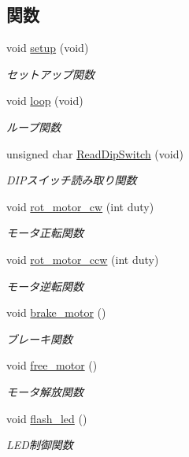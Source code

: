 \subsection*{関数}
\begin{DoxyCompactItemize}
\item 
void \mbox{\hyperlink{iraira__bo__up__down_8ino_a7dfd9b79bc5a37d7df40207afbc5431f}{setup}} (void)
\begin{DoxyCompactList}\small\item\em セットアップ関数 \end{DoxyCompactList}\item 
void \mbox{\hyperlink{iraira__bo__up__down_8ino_a0b33edabd7f1c4e4a0bf32c67269be2f}{loop}} (void)
\begin{DoxyCompactList}\small\item\em ループ関数 \end{DoxyCompactList}\item 
unsigned char \mbox{\hyperlink{iraira__bo__up__down_8ino_a77b0a767d95108a48a54b857588d2863}{Read\+Dip\+Switch}} (void)
\begin{DoxyCompactList}\small\item\em D\+I\+Pスイッチ読み取り関数 \end{DoxyCompactList}\item 
void \mbox{\hyperlink{iraira__bo__up__down_8ino_a0c28692fe5e9f44573ec307d7cae2d9b}{rot\+\_\+motor\+\_\+cw}} (int duty)
\begin{DoxyCompactList}\small\item\em モータ正転関数 \end{DoxyCompactList}\item 
void \mbox{\hyperlink{iraira__bo__up__down_8ino_a0a80149a1ef7c2030aba634830be590a}{rot\+\_\+motor\+\_\+ccw}} (int duty)
\begin{DoxyCompactList}\small\item\em モータ逆転関数 \end{DoxyCompactList}\item 
void \mbox{\hyperlink{iraira__bo__up__down_8ino_af7b0658dcbb1e0e8f14eb54b4edfcf72}{brake\+\_\+motor}} ()
\begin{DoxyCompactList}\small\item\em ブレーキ関数 \end{DoxyCompactList}\item 
void \mbox{\hyperlink{iraira__bo__up__down_8ino_a81f542f98f75dcfd71f410277a1cb3cf}{free\+\_\+motor}} ()
\begin{DoxyCompactList}\small\item\em モータ解放関数 \end{DoxyCompactList}\item 
void \mbox{\hyperlink{iraira__bo__up__down_8ino_a4858ffbdc03c7fb912c742beba95c65c}{flash\+\_\+led}} ()
\begin{DoxyCompactList}\small\item\em L\+E\+D制御関数 \end{DoxyCompactList}\end{DoxyCompactItemize}
